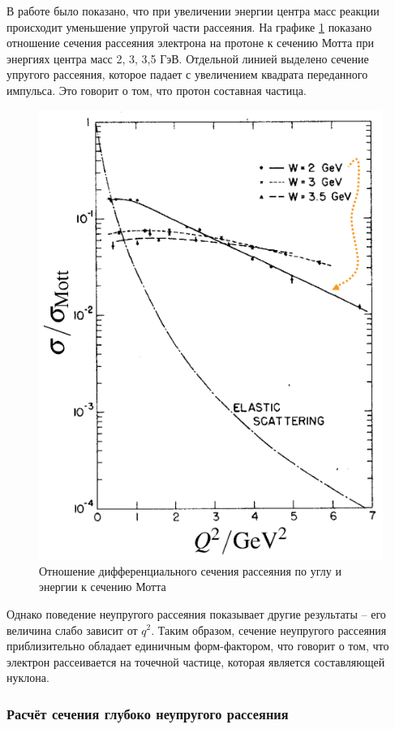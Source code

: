 \documentclass{extarticle}
\begin{document}
В работе \cite{Breidenbach} было показано, что при увеличении энергии центра масс реакции происходит уменьшение упругой части рассеяния. На графике \ref{fig:Mott} показано отношение сечения рассеяния электрона на протоне к сечению Мотта при энергиях центра масс 2, 3, 3,5 ГэВ. Отдельной линией выделено сечение упругого рассеяния, которое падает с увеличением квадрата переданного импульса. Это говорит о том, что протон составная частица. 
\begin{figure}[h]
    \centering
    \includegraphics[width = 0.6\linewidth]{Mott.png}
    \caption{Отношение дифференциального сечения рассеяния по углу и энергии к сечению Мотта \cite{Breidenbach}}
    \label{fig:Mott}
\end{figure}

Однако поведение неупругого рассеяния показывает другие результаты -- его величина слабо зависит от $q^2$. Таким образом, сечение неупругого рассеяния приблизительно обладает единичным форм-фактором, что говорит о том, что электрон рассеивается на точечной частице, которая является составляющей нуклона.

\subsubsection{Расчёт сечения глубоко неупругого рассеяния}
\end{document}
